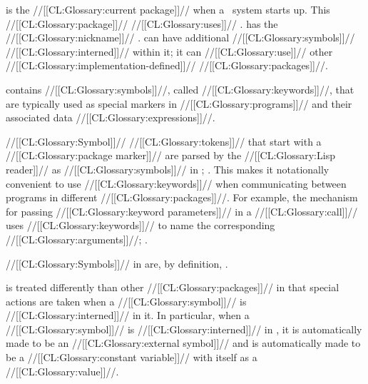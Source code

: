  is the //[[CL:Glossary:current package]]// when  a \clisp\ system starts up.  This //[[CL:Glossary:package]]// //[[CL:Glossary:uses]]// .  has the //[[CL:Glossary:nickname]]// .   can have additional //[[CL:Glossary:symbols]]// //[[CL:Glossary:interned]]// within it; it can //[[CL:Glossary:use]]// other //[[CL:Glossary:implementation-defined]]// //[[CL:Glossary:packages]]//.

  \endsubsubsection%

 

 contains //[[CL:Glossary:symbols]]//, called //[[CL:Glossary:keywords]]//, that are typically used as special markers in //[[CL:Glossary:programs]]//  and their associated data //[[CL:Glossary:expressions]]//.

//[[CL:Glossary:Symbol]]// //[[CL:Glossary:tokens]]// that start with a //[[CL:Glossary:package marker]]//  are parsed by the //[[CL:Glossary:Lisp reader]]// as //[[CL:Glossary:symbols]]//  in ; \seesection\SymbolTokens. This makes it notationally convenient to use //[[CL:Glossary:keywords]]// when communicating between programs in different //[[CL:Glossary:packages]]//.   For example, the mechanism for passing //[[CL:Glossary:keyword parameters]]// in a //[[CL:Glossary:call]]// uses  //[[CL:Glossary:keywords]]// to name the corresponding //[[CL:Glossary:arguments]]//; \seesection\OrdinaryLambdaLists.

//[[CL:Glossary:Symbols]]// in  are, by definition, .


 is treated differently than other //[[CL:Glossary:packages]]// in that special actions are taken when a //[[CL:Glossary:symbol]]// is //[[CL:Glossary:interned]]// in it. In particular, when a //[[CL:Glossary:symbol]]// is //[[CL:Glossary:interned]]// in ,
 it is automatically made to be an //[[CL:Glossary:external symbol]]//  and is automatically made to be a //[[CL:Glossary:constant variable]]// with itself as a //[[CL:Glossary:value]]//.

\endsubsubsubsection%

